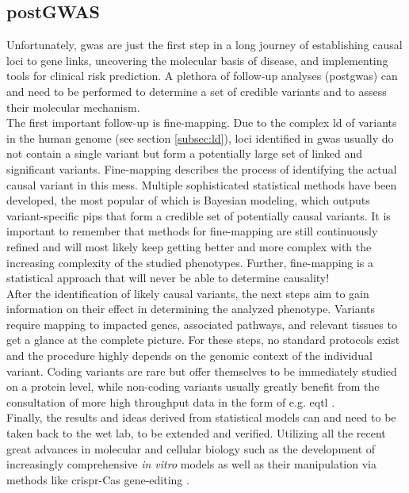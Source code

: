     \subsection{postGWAS}
    \label{subsec:gwas_limit}
    Unfortunately, \ac{gwas} are just the first step in a long journey of establishing causal loci to gene links, uncovering the molecular basis of disease, and implementing tools for clinical risk prediction. A plethora of follow-up analyses (post\ac{gwas}) can and need to be performed to determine a set of credible variants and to assess their molecular mechanism.\\
    The first important follow-up is fine-mapping. Due to the complex \ac{ld} of variants in the human genome (see section \ref{subsec:ld}), loci identified in \ac{gwas} usually do not contain a single variant but form a potentially large set of linked and significant variants. Fine-mapping describes the process of identifying the actual causal variant in this mess. Multiple sophisticated statistical methods have been developed, the most popular of which is Bayesian modeling, which outputs variant-specific \acp{pip} that form a credible set of potentially causal variants. It is important to remember that methods for fine-mapping are still continuously refined and will most likely keep getting better and more complex with the increasing complexity of the studied phenotypes. Further, fine-mapping is a statistical approach that will never be able to determine causality! \cite{schaidGenomewideAssociationsCandidate2018, uffelmannGenomewideAssociationStudies2021}\\
    After the identification of likely causal variants, the next steps aim to gain information on their effect in determining the analyzed phenotype. Variants require mapping to impacted genes, associated pathways, and relevant tissues to get a glance at the complete picture. For these steps, no standard protocols exist and the procedure highly depends on the genomic context of the individual variant. Coding variants are rare but offer themselves to be immediately studied on a protein level, while non-coding variants usually greatly benefit from the consultation of more high throughput data in the form of e.g. \ac{eqtl} \cite{uffelmannGenomewideAssociationStudies2021}.\\
    Finally, the results and ideas derived from statistical models can and need to be taken back to the wet lab, to be extended and verified. Utilizing all the recent great advances in molecular and cellular biology such as the development of increasingly comprehensive \textit{in vitro} models as well as their manipulation via methods like \ac{crispr}-Cas gene-editing \cite{lichouFunctionalStudiesGWAS2020}.


